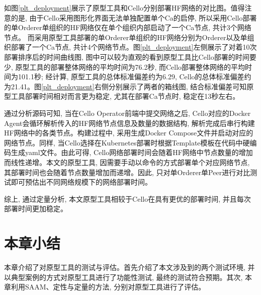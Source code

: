 如图\ref{plt_deployment}展示了原型工具和Cello分别部署HF网络的对比图。值得注意的是, 由于Cello采用图形化界面无法单独配置单个Ca的启停, 所以采用Cello部署的单Orderer单组织的HF网络仅在单个组织内部启动了一个Ca节点, 共计3个网络节点。 而采用原型工具部署的单Orderer单组织的HF网络分别为Orderer以及单组织部署了一个Ca节点, 共计4个网络节点。图\ref{plt_deployment}左侧展示了对着10次部署排序后的时间曲线图, 图中可以较为直观的看到原型工具比Cello部署的时间要少, 原型工具的部署整体网络的平均时间为76.2秒, 而Cello部署整体网络的平均时间为101.1秒; 经计算, 原型工具的总体标准偏差约为6.29, Cello的总体标准偏差约为21.41。图\ref{plt_deployment}右侧分别展示了两者的箱线图, 结合标准偏差可知原型工具部署时间相对而言更为稳定, 尤其在部署Ca节点时, 稳定在13秒左右。

通过分析源码\footnotemark[1]可知, 当在Cello Operator前端中提交网络之后, Cello对应的Docker Agent会循环解析传入的HF网络节点信息及数量的数据结构, 解析完成后串行构建HF网络中的各类节点。构建过程中, 采用生成Docker Compose文件并启动对应的网络节点。同样, 当Cello选择在Kubernetes部署时根据Template模板在代码中硬编码生成yaml文件。由此可得, Cello网络部署时间会随着HF网络中节点数量的增加而线性递增。本文的原型工具, 因需要手动以命令的方式部署单个对应网络节点, 其部署时间也会随着节点数量增加而递增。因此, 只对单Orderer单Peer进行对比测试即可预估出不同网络规模下的网络部署时间。

综上, 通过定量分析, 本文原型工具相较于Cello在具有更优的部署时间, 并且每次部署时间更加稳定。


\section{本章小结}

本章介绍了对原型工具的测试与评估。首先介绍了本文涉及到的两个测试环境, 并以典型案例的方式对原型工具进行了功能性测试, 最终的测试符合预期。其次, 本章利用SAAM、定性与定量的方法, 分别对原型工具进行了评估。
